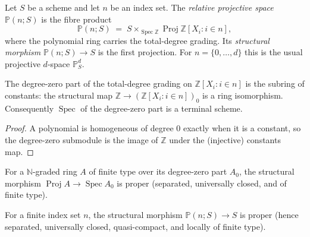 \begin{definition}
  \label{def:projective_space}
  \leanok
  Let \(S\) be a scheme and let \(n\) be an index set.  The \emph{relative
  projective space} \(\mathbb{P}(n; S)\) is the fibre product
  \[
    \mathbb{P}(n; S) \;=\; S \times_{\operatorname{Spec} \mathbb{Z}}
      \operatorname{Proj} \mathbb{Z}[X_i : i \in n],
  \]
  where the polynomial ring carries the total-degree grading.  Its
  \emph{structural morphism} \(\mathbb{P}(n; S) \to S\) is the first
  projection.  For \(n = \{0, \dots, d\}\) this is the usual projective
  \(d\)-space \(\mathbb{P}^d_S\).
\end{definition}

\begin{lemma}
  \label{lem:projective_space_gradeZero}
  \leanok
  The degree-zero part of the total-degree grading on
  \(\mathbb{Z}[X_i : i \in n]\) is the subring of constants: the structural
  map \(\mathbb{Z} \to (\mathbb{Z}[X_i : i \in n])_0\) is a ring isomorphism.
  Consequently \(\operatorname{Spec}\) of the degree-zero part is a terminal
  scheme.
\end{lemma}

\begin{proof}
  \leanok
  A polynomial is homogeneous of degree \(0\) exactly when it is a constant,
  so the degree-zero submodule is the image of \(\mathbb{Z}\) under the
  (injective) constants map.
\end{proof}

\begin{lemma}
  \label{lem:proj_toSpecZero_proper}
  \mathlibok
  For a \(\mathbb{N}\)-graded ring \(A\) of finite type over its degree-zero
  part \(A_0\), the structural morphism
  \(\operatorname{Proj} A \to \operatorname{Spec} A_0\) is proper (separated,
  universally closed, and of finite type).
\end{lemma}

\begin{lemma}
  \label{lem:projective_space_proper}
  \leanok
  For a finite index set \(n\), the structural morphism
  \(\mathbb{P}(n; S) \to S\) is proper (hence separated, universally closed,
  quasi-compact, and locally of finite type).
\end{lemma}

